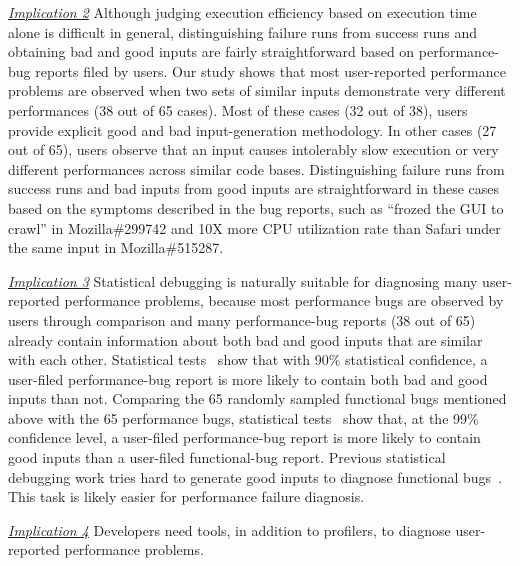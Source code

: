 \underline{\textit{Implication 2}}
Although judging execution efficiency based on execution time alone 
is difficult in
general, distinguishing failure runs from success runs and obtaining bad and good
inputs are fairly straightforward based on performance-bug reports filed by 
users.
Our study shows that most user-reported performance problems are observed when 
two sets of similar inputs demonstrate very different performances (38 out of 
65 cases). 
Most of these cases (32 out of 38), users provide explicit good and bad 
input-generation methodology. 
In other cases (27 out of 65),
users observe that an input causes intolerably slow execution or very different
performances across similar code bases. Distinguishing
failure runs from success runs and bad inputs from good inputs are 
straightforward in these cases based on the symptoms described
in the bug reports, such as ``frozed the GUI to
crawl'' in Mozilla\#299742 and 10X more CPU utilization rate than Safari 
under the same input in Mozilla\#515287. 

\underline{\textit{Implication 3}}
Statistical debugging is naturally suitable for diagnosing many
user-reported performance problems,
because most performance bugs are observed by users through comparison and many
performance-bug reports (38 out of 65) already contain information about 
both bad and good inputs that are similar with each other.
Statistical tests~\citep{ztest} show that with 90\% statistical confidence, 
a user-filed performance-bug report is more likely to contain both 
bad and good inputs than not.
Comparing the 65 randomly sampled functional bugs mentioned above with the 65
performance bugs, 
statistical tests~\citep{ztest} show that, at the 99\% confidence level, 
a user-filed performance-bug report is more likely to contain
good inputs than a user-filed
functional-bug report.
Previous statistical debugging work tries hard to generate good
inputs to diagnose functional bugs~\citep{delta}. This task is
likely easier for performance failure diagnosis.

\underline{\textit{Implication 4}}
Developers need tools, in addition to profilers, to diagnose
user-reported performance problems.
